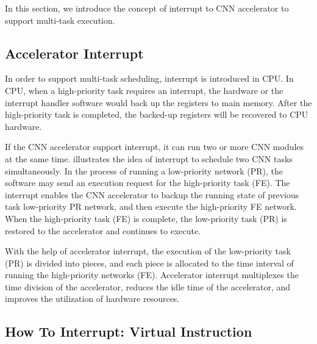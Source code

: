 
In this section, we introduce the concept of interrupt to CNN accelerator to support multi-task execution.

\subsection{Accelerator Interrupt}

In order to support multi-task scheduling, interrupt is introduced in CPU. 
In CPU, when a high-priority task requires an interrupt, the hardware or the interrupt handler software would back up the registers to main memory.
After the high-priority task is completed, the backed-up registers will be recovered to CPU hardware. 

If the CNN accelerator support interrupt, it can run two or more CNN modules at the same time.  illustrates the idea of interrupt to schedule two CNN tasks simultaneously. In the process of running a low-priority network (PR), the software may send an execution request for the high-priority task (FE). The interrupt enables the CNN accelerator to backup the running state of previous task low-priority PR network, and then execute the high-priority FE network. When the high-priority task (FE) is complete, the low-priority task (PR) is restored to the accelerator and continues to execute.

With the help of accelerator interrupt, the execution of the low-priority task (PR) is divided into pieces, and each piece is allocated to the time interval of running the high-priority networks (FE). 
Accelerator interrupt multiplexes the time division of the accelerator, reduces the idle time of the accelerator, and improves the utilization of hardware resources. 

\subsection{How To Interrupt: Virtual Instruction}
\label{sec:howinter}


